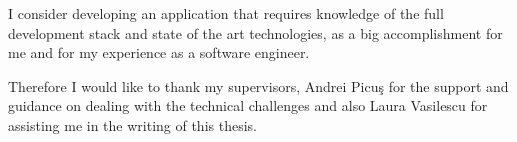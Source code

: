 \vspace*{7cm}
\begin{center}
I consider developing an application that requires knowledge of the full development stack and state of the art technologies, as a big accomplishment for me and for my experience as a software engineer.  
\end{center}
\vspace{0.6cm}
\begin{center}
Therefore I would like to thank my supervisors, Andrei Picuş for the support and guidance on dealing with the technical challenges and also Laura Vasilescu for assisting me in the writing of this thesis. 
\end{center}
